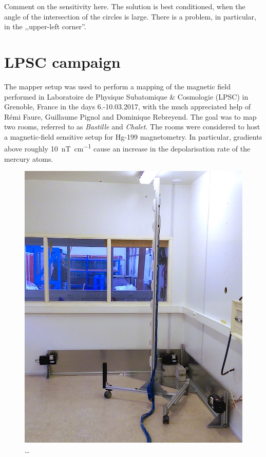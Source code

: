 Comment on the sensitivity here. The solution is best conditioned, when the angle of the intersection of the circles is large. There is a problem, in particular, in the ,,upper-left corner''.



\section{LPSC campaign}
The mapper setup was used to perform a mapping of the magnetic field performed in Laboratoire de Physique Subatomique \& Cosmologie (LPSC) in Grenoble, France in the days 6.-10.03.2017, with the much appreciated help of Rémi Faure, Guillaume Pignol and Dominique Rebreyend. The goal was to map two rooms, referred to as \emph{Bastille} and \emph{Chalet}. The rooms were considered to host a magnetic-field sensitive setup for Hg-199 magnetometry. In particular, gradients above roughly \SI[per-mode=symbol]{10}{\nano\tesla\per\centi\meter} cause an increase in the depolarisation rate of the mercury atoms.

\begin{figure}
  \centering
  \includegraphics[width=0.9\linewidth]{gfx/mapping/lpsc/setup_edited.jpg}
  \caption{\ldots}
  \label{fig:mapping_bastille_setup}
\end{figure}

